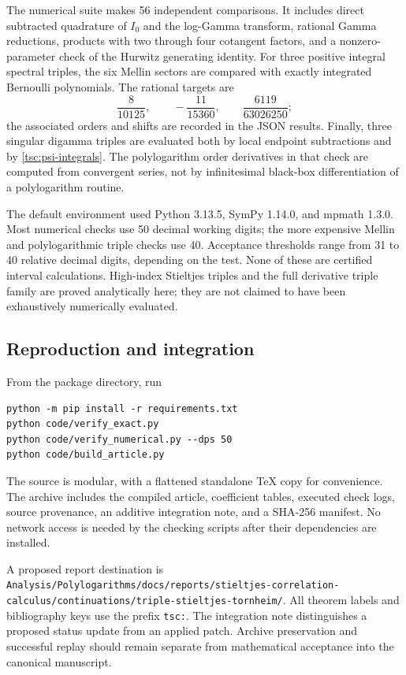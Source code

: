 \documentclass[11pt]{article}
\numberwithin{equation}{section}
\theoremstyle{definition}\newtheorem{definition}[theorem]{Definition}
\theoremstyle{remark}\newtheorem{remark}[theorem]{Remark}
\newcommand{\src}[1]{\nolinkurl{#1}}
\begin{document}
The numerical suite makes 56 independent comparisons. It includes direct
subtracted quadrature of $I_0$ and the log-Gamma transform, rational Gamma
reductions, products with two through four cotangent factors, and a
nonzero-parameter check of the Hurwitz generating identity. For three
positive integral spectral triples, the six Mellin sectors are compared
with exactly integrated Bernoulli polynomials. The rational targets are
\begin{equation}\label{tsc:bernoulli-targets}
 \frac8{10125},\qquad -\frac{11}{15360},\qquad
 \frac{6119}{63026250};
\end{equation}
the associated orders and shifts are recorded in the JSON results.
Finally, three singular digamma triples are evaluated both by local
endpoint subtractions and by \eqref{tsc:psi-integrals}. The polylogarithm
order derivatives in that check are computed from convergent series,
not by infinitesimal black-box differentiation of a polylogarithm routine.

The default environment used Python 3.13.5, SymPy 1.14.0, and mpmath 1.3.0.
Most numerical checks use 50 decimal working digits; the more expensive
Mellin and polylogarithmic triple checks use 40. Acceptance thresholds range
from 31 to 40 relative decimal digits, depending on the test. None of these
are certified interval calculations. High-index Stieltjes triples and the
full derivative triple family are proved analytically here; they are not
claimed to have been exhaustively numerically evaluated.

\subsection{Reproduction and integration}
From the package directory, run
\begin{verbatim}
python -m pip install -r requirements.txt
python code/verify_exact.py
python code/verify_numerical.py --dps 50
python code/build_article.py
\end{verbatim}
The source is modular, with a flattened standalone TeX copy for convenience.
The archive includes the compiled article, coefficient tables, executed
check logs, source provenance, an additive integration note, and a SHA-256
manifest. No network access is needed by the checking scripts after their
dependencies are installed.

A proposed report destination is
\src{Analysis/Polylogarithms/docs/reports/stieltjes-correlation-calculus/continuations/triple-stieltjes-tornheim/}.
All theorem labels and bibliography keys use the prefix \src{tsc:}.
The integration note distinguishes a proposed status update from an applied
patch. Archive preservation and successful replay should remain separate
from mathematical acceptance into the canonical manuscript.
\end{document}
